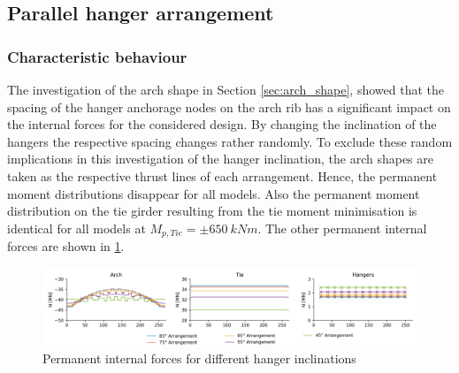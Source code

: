 \subsection{Parallel hanger arrangement}
\subsubsection{Characteristic behaviour}
The investigation of the arch shape in Section \ref{sec:arch_shape}, showed that the spacing of the hanger anchorage nodes on the arch rib has a significant impact on the internal forces for the considered design. By changing the inclination of the hangers the respective spacing changes rather randomly. To exclude these random implications in this investigation of the hanger inclination, the arch shapes are taken as the respective thrust lines of each arrangement. Hence, the permanent moment distributions disappear for all models. Also the permanent moment distribution on the tie girder resulting from the tie moment minimisation is identical for all models at $M_{p,Tie}=\pm \SI{650}{kNm}$. The other permanent internal forces are shown in \cref{fig:inclination_permanent}.

\begin{figure}[H]
    \centering
    \includegraphics[trim={1cm 0 1cm 0},clip, width=\textwidth]{calculations/parallel arrangement comparison/permanent_plot.png}
    \caption{Permanent internal forces for different hanger inclinations}
    \label{fig:inclination_permanent}
\end{figure}

